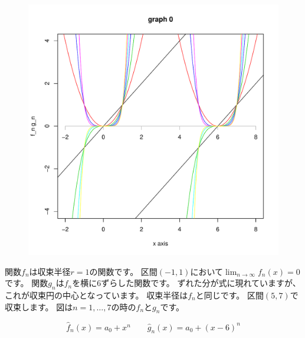 \documentclass[12pt,b5paper]{ltjsarticle}
\begin{document}
\begin{figure}%
 \begin{center}
  \includegraphics[scale=0.4]{graph1_R.pdf}
 \end{center}
\end{figure}
関数$f_n$は収束半径$r=1$の関数です。
区間$(-1,1)$において$\lim_{n\rightarrow\infty} f_n(x)=0$です。
関数$g_n$は$f_n$を横に$6$ずらした関数です。
ずれた分が式に現れていますが、これが収束円の中心となっています。
収束半径は$f_n$と同じです。
区間$(5,7)$で収束します。
図は$n=1,\dots,7$の時の$f_n$と$g_n$です。


\quad

\quad

\quad

\begin{equation}
 \hat{f}_n(x)=a_0+x^n \qquad \hat{g}_n(x)=a_0+(x-6)^n
\end{equation}
\end{document}

